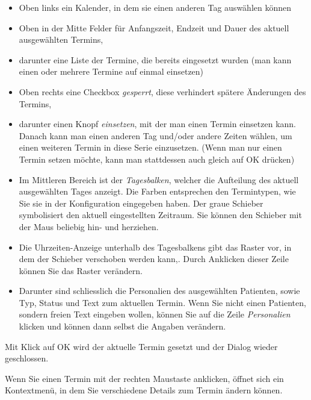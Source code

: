 \begin{itemize}
 \item Oben links ein Kalender, in dem sie einen anderen Tag auswählen können
\item Oben in der Mitte Felder für Anfangszeit, Endzeit und Dauer des aktuell ausgewählten Termins,
\item  darunter eine Liste der Termine, die bereits eingesetzt wurden (man kann einen oder mehrere Termine auf einmal einsetzen)
\item Oben rechts eine Checkbox \textit{gesperrt}, diese verhindert spätere Änderungen des Termins,
\item  darunter einen Knopf \textit{einsetzen}, mit der man einen Termin einsetzen kann. Danach kann man einen anderen Tag und/oder andere Zeiten wählen, um einen weiteren Termin in diese Serie einzusetzen. (Wenn man nur einen Termin setzen möchte, kann man stattdessen auch gleich auf OK drücken)
\item Im Mittleren Bereich ist der \textit{Tagesbalken}, welcher die Aufteilung des aktuell ausgewählten Tages anzeigt. Die Farben entsprechen den Termintypen, wie Sie sie in der Konfiguration eingegeben haben. Der graue Schieber symbolisiert den aktuell eingestellten Zeitraum. Sie können den Schieber mit der Maus beliebig hin- und herziehen.
\item Die Uhrzeiten-Anzeige unterhalb des Tagesbalkens gibt das Raster vor, in dem der Schieber verschoben werden kann,. Durch Anklicken dieser Zeile können Sie das Raster verändern.


\item Darunter sind schliesslich die Personalien des ausgewählten Patienten, sowie Typ, Status und Text zum aktuellen Termin.
Wenn Sie nicht einen Patienten, sondern freien Text eingeben wollen, können Sie auf die Zeile \textit{Personalien} klicken und können dann selbst die Angaben verändern.
\end{itemize}

Mit Klick auf OK wird der aktuelle Termin gesetzt und der Dialog wieder geschlossen.


Wenn Sie einen Termin mit der rechten Maustaste anklicken, öffnet sich ein Kontextmenü, in dem Sie verschiedene Details zum Termin ändern können.

